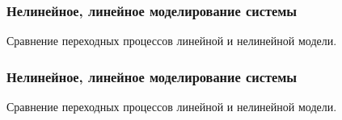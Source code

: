 \documentclass{beamer}
\begin{document}
\begin{frame}[t]
    \frametitle{Нелинейное, линейное моделирование системы}
    \begin{center}
        Сравнение переходных процессов линейной и нелинейной модели.
        \vspace{14pt}

        \begin{minipage}{0.49\textwidth}
            \begin{center}
                \resizebox{1.0\textwidth}{!}{}
            \end{center}
        \end{minipage}
        \hfill
        \begin{minipage}{0.49\textwidth}
            \begin{center}
                \resizebox{1.0\textwidth}{!}{}
            \end{center}
        \end{minipage}
    \end{center}
\end{frame}


\begin{frame}[t]
    \frametitle{Нелинейное, линейное моделирование системы}
    \begin{center}
        Сравнение переходных процессов линейной и нелинейной модели.
        \vspace{14pt}

        \begin{minipage}{0.49\textwidth}
            \begin{center}
                \resizebox{1.0\textwidth}{!}{}
            \end{center}
        \end{minipage}
        \hfill
        \begin{minipage}{0.49\textwidth}
            \begin{center}
                \resizebox{1.0\textwidth}{!}{}
            \end{center}
        \end{minipage}
    \end{center}
\end{frame}
\end{document}
